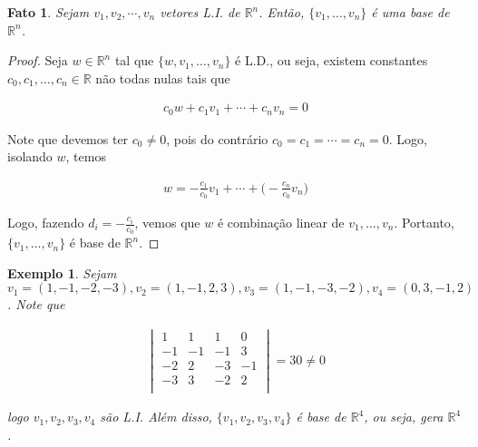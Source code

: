 \documentclass{article}
\newtheorem*{fact}{Fato}
\newtheorem*{example}{Exemplo}
\begin{document}
\begin{fact}
	Sejam $v_1, v_2, \cdots, v_n$ vetores L.I. de $\mathbb{R}^n$. Então, $\{v_1, \dots, v_n\}$ é uma base de $\mathbb{R}^n$.
\end{fact}

\begin{proof}
	Seja $w\in\mathbb{R}^n$ tal que $\{w, v_1, \dots, v_n\}$ é L.D., ou seja, existem constantes $c_0, c_1, \dots, c_n\in\mathbb{R}$ não todas nulas tais que 
	
	\begin{align*}
	c_0w + c_1v_1 + \cdots + c_nv_n = 0
	\end{align*}
	
	\par\vspace{0.3cm} Note que devemos ter $c_0\neq 0$, pois do contrário $c_0 = c_1 = \cdots = c_n = 0$. Logo, isolando $w$, temos
	
	\begin{align*}
	w = -\frac{c_1}{c_0}v_1 + \cdots +\Big(-\frac{c_n}{c_0}v_n\Big)
	\end{align*}
	
	\par\vspace{0.3cm} Logo, fazendo $\displaystyle{d_i = -\frac{c_i}{c_0}}$, vemos que $w$ é combinação linear de $v_1, \dots, v_n$. Portanto, $\{v_1, \dots, v_n\}$ é base de $\mathbb{R}^n$.
	
\end{proof}

\begin{example}
	Sejam $v_1 = (1, -1, -2, -3), v_2 = (1, -1, 2, 3), v_3 = (1, -1, -3, -2), v_4 = (0, 3, -1, 2)$. Note que
	
	\begin{align*}
	\begin{vmatrix}
	1 & 1 & 1 & 0 \\
	-1 & -1 & -1 & 3 \\
	-2 & 2 & -3 & -1 \\
	-3 & 3 & -2 & 2 \\
	\end{vmatrix} = 30 \neq 0
	\end{align*}
	
	\par\vspace{0.3cm} logo $v_1, v_2, v_3, v_4$ são L.I. Além disso, $\{v_1, v_2, v_3, v_4\}$ é base de $\mathbb{R}^4$, ou seja, gera $\mathbb{R}^4$.
	
\end{example}
\end{document}
